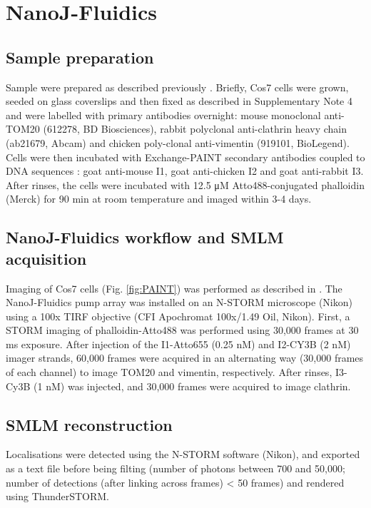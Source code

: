 \section{NanoJ-Fluidics}

\subsection{Sample preparation}

Sample were prepared as described previously \cite{almada2018automating}. Briefly, Cos7 cells were grown, seeded on glass coverslips and then fixed as described in Supplementary Note 4 and were labelled with primary antibodies overnight: mouse monoclonal anti-TOM20 (612278, BD Biosciences), rabbit polyclonal anti-clathrin heavy chain (ab21679, Abcam) and chicken poly-clonal anti-vimentin (919101, BioLegend). Cells were then incubated with Exchange-PAINT secondary antibodies coupled to DNA sequences \cite{almada2018automating}: goat anti-mouse I1, goat anti-chicken I2 and goat anti-rabbit I3. After rinses, the cells were incubated with 12.5 μM Atto488-conjugated phalloidin (Merck) for 90 min at room temperature and imaged within 3-4 days. 

\subsection{NanoJ-Fluidics workflow and SMLM acquisition}

Imaging of Cos7 cells (Fig. \ref{fig:PAINT}) was performed as described in \cite{almada2018automating}. The NanoJ-Fluidics pump array was installed on an N-STORM microscope (Nikon) using a 100x TIRF objective (CFI Apochromat 100x/1.49 Oil, Nikon). First, a STORM imaging of phalloidin-Atto488 was performed using 30,000 frames at 30 ms exposure. After injection of the I1-Atto655 (0.25 nM) and I2-CY3B (2 nM) imager strands, 60,000 frames were acquired in an alternating way (30,000 frames of each channel) to image TOM20 and vimentin, respectively. After rinses, I3-Cy3B (1 nM) was injected, and 30,000 frames were acquired to image clathrin.

\subsection{SMLM reconstruction}

Localisations were detected using the N-STORM software (Nikon), and exported as a text file before being filting (number of photons between 700 and 50,000; number of detections (after linking across frames) < 50 frames) and rendered using ThunderSTORM.

